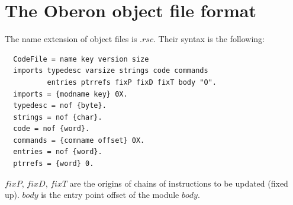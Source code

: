 \section{The Oberon object file format}
The name extension of object files is $.rsc$. Their syntax is the following:
\begin{verbatim}
  CodeFile = name key version size
  imports typedesc varsize strings code commands
          entries ptrrefs fixP fixD fixT body "O".
  imports = {modname key} 0X.
  typedesc = nof {byte}.
  strings = nof {char}.
  code = nof {word}.
  commands = {comname offset} 0X.
  entries = nof {word}.
  ptrrefs = {word} 0.
\end{verbatim}
$fixP$, $fixD$, $fixT$ are the origins of chains of instructions to be updated (fixed up). $body$ is the entry point
offset of the module $body$.
